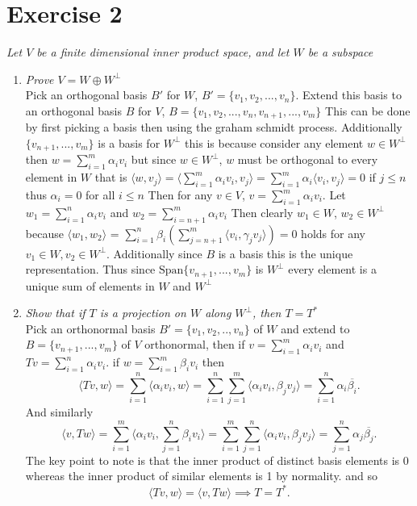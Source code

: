 \documentclass{article}
\begin{document}
    \section{Exercise 2}
    \emph{
        Let $V$ be a finite dimensional inner product space, and let $W$ be a subspace
    }
    \begin{enumerate}
        \item \emph{ Prove $V = W \oplus W^{\perp}$ } \\
            Pick an orthogonal basis $B'$ for $W$,  $B' = \{v_1,v_2,...,v_n\}$. Extend this basis
            to an orthogonal basis $B$ for $V$, $B = \{v_1,v_2,...,v_n,v_{n+1},...,v_m\}$ This can be done by first picking a basis then using
            the graham schmidt process. Additionally $\{v_{n+1},...,v_m\}$ is a basis for $W^{\perp}$ this is because consider any element $w \in W^{\perp}$ then
            $w = \sum_{i=1}^{m}\alpha_iv_i$ but since $w \in W^{\perp}$, $w$ must be orthogonal to every element in $W$ that is $\langle w, v_j \rangle = \langle \sum_{i=1}^{m}\alpha_iv_i, v_j \rangle = \sum_{i=1}^{m} \alpha_i\langle v_i, v_j \rangle = 0$ if $j \le n$ 
            thus $\alpha_i = 0$ for all $i \le n$ Then for any $v \in V$,  $v = \sum_{i=1}^{m}\alpha_i v_i$.
            Let $w_1 = \sum_{i=1}^{n}\alpha_i v_i$ and $w_2 = \sum_{i=n+1}^{m}\alpha_i v_i$
            Then clearly $w_1 \in W$, $w_2 \in W^{\perp}$ because $\langle w_1 , w_2 \rangle$ = $\sum_{i=1}^{n}\beta_i(\sum_{j=n+1}^{m}\langle v_i,\gamma_j v_j \rangle) = 0 $ holds for any $v_1 \in W, v_2 \in W^{\perp}$.
            Additionally since $B$ is a basis this is the unique representation. Thus since $\text{Span}\{v_{n+1},...,v_m\}$ is  $W^{\perp}$ every element is a unique sum of elements
            in $W$ and $W^{\perp}$
        \item \emph{Show that if $T$ is a projection on $W$ along $W^{\perp}$, then $T = T^{*}$}\\
            Pick an orthonormal basis $B' = \{v_1,v_2,..,v_n\}$ of $W$ and extend to $B = \{v_{n+1},...,v_m\}$ of $V$ orthonormal, then
            if  $v = \sum_{i=1}^{m}\alpha_iv_i$ and $Tv = \sum_{i=1}^{n}\alpha_iv_i$. if $w = \sum_{i=1}^{m}\beta_i v_i$ then
            \[
            \langle Tv, w \rangle = \sum_{i=1}^{n} \langle \alpha_i v_i, w \rangle = \sum_{i=1}^{n}\sum_{j=1}^{m} \langle \alpha_i v_i, \beta_j v_j \rangle = \sum_{i=1}^{n} \alpha_i \overline{\beta_i}
            .\] 
            And similarly
            \[
            \langle v, Tw \rangle = \sum_{i=1}^{m} \langle \alpha_i v_i, \sum_{j=1}^{n} \beta_i v_i \rangle = \sum_{i=1}^{m}\sum_{j=1}^{n} \langle \alpha_i v_i, \beta_j v_j \rangle = \sum_{j=1}^{n} \alpha_j \overline{\beta_j}
            .\] 
            The key point to note is that the inner product of distinct basis elements is 0 whereas the inner product of similar elements is 1 by normality. and so
            \[
            \langle Tv, w \rangle = \langle v, Tw \rangle \implies T = T^{*}
            .\] 
    \end{enumerate}
\end{document}
